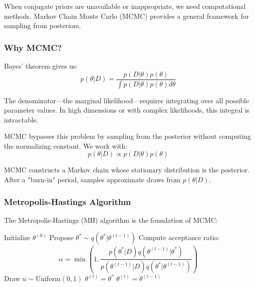 When conjugate priors are unavailable or inappropriate, we need computational methods. Markov Chain Monte Carlo (MCMC) provides a general framework for sampling from posteriors.

\subsubsection{Why MCMC?}

Bayes' theorem gives us:
\begin{equation}
p(\theta | D) = \frac{p(D | \theta) p(\theta)}{\int p(D | \theta) p(\theta) d\theta}
\end{equation}

The denominator—the marginal likelihood—requires integrating over all possible parameter values. In high dimensions or with complex likelihoods, this integral is intractable.

MCMC bypasses this problem by sampling from the posterior without computing the normalizing constant. We work with:
\begin{equation}
p(\theta | D) \propto p(D | \theta) p(\theta)
\end{equation}

MCMC constructs a Markov chain whose stationary distribution is the posterior. After a "burn-in" period, samples approximate draws from $p(\theta | D)$.

\subsubsection{Metropolis-Hastings Algorithm}

The Metropolis-Hastings (MH) algorithm is the foundation of MCMC:

\begin{algorithm}[H]
\caption{Metropolis-Hastings Algorithm}
\begin{algorithmic}[1]
\STATE Initialize $\theta^{(0)}$
    \STATE Propose $\theta^* \sim q(\theta^* | \theta^{(t-1)})$ 
    \STATE Compute acceptance ratio:
    \begin{equation*}
    \alpha = \min\left(1, \frac{p(\theta^* | D) q(\theta^{(t-1)} | \theta^*)}{p(\theta^{(t-1)} | D) q(\theta^* | \theta^{(t-1)})}\right)
    \end{equation*}
    \STATE Draw $u \sim \text{Uniform}(0, 1)$
        \STATE $\theta^{(t)} = \theta^*$ 
    \ELSE
        \STATE $\theta^{(t)} = \theta^{(t-1)}$ 
    \ENDIF
\ENDFOR
\end{algorithmic}
\end{algorithm}

